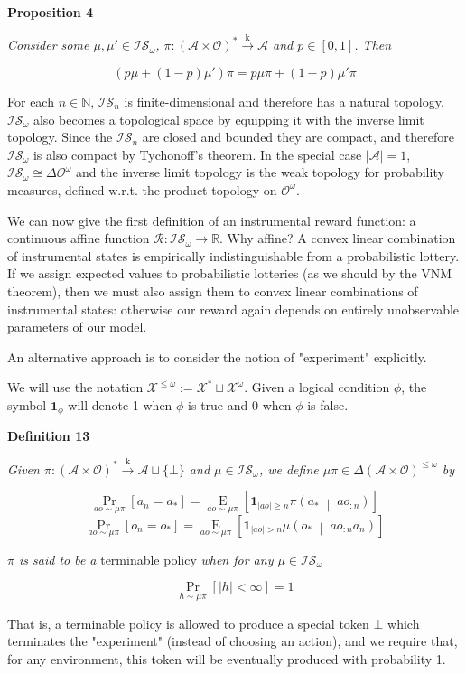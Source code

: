 \documentclass[a4paper]{article}
\newcommand{\Co}[1]{}
\newcommand{\AP}[1]{\left(#1\right)}
\newcommand{\AB}[1]{\left[#1\right]}
\newcommand{\APM}[2]{\left(#1\;\middle\vert\;#2\right)}
\newcommand{\Pa}[2]{\underset{#1}{\operatorname{Pr}}\AB{#2}}
\newcommand{\Ea}[2]{\underset{#1}{\operatorname{E}}\AB{#2}}
\newcommand{\Nats}{\mathbb{N}}
\newcommand{\Reals}{\mathbb{R}}
\newcommand{\Abs}[1]{\left\vert #1 \right\vert}
\newcommand{\K}{\xrightarrow{\mathrm{k}}}
\newcommand{\A}{\mathcal{A}}
\newcommand{\AX}{\A\sqcup\{\bot\}}
\newcommand{\Ob}{\mathcal{O}}
\newcommand{\AO}{\AP{\A\times\Ob}}
\newcommand{\FH}{\AO^*}
\newcommand{\R}{\mathcal{R}}
\newcommand{\IS}{\mathcal{IS}}
\newcommand{\X}{\mathcal{X}}
\begin{document}
\textbf{Proposition 4}\Co{b}

\textit{Consider some $\mu,\mu'\in\IS_\omega$,  $\pi:\FH\K\A$ and $p\in[0,1]$. Then}\Co{i}

$$\AP{p\mu+(1-p)\mu'}\pi=p\mu\pi+(1-p)\mu'\pi$$

For each $n\in\Nats$, $\IS_n$ is finite-dimensional and therefore has a natural topology. $\IS_\omega$ also becomes a topological space by equipping it with the inverse limit topology. Since the $\IS_n$ are closed and bounded they are compact, and therefore $\IS_\omega$ is also compact by Tychonoff's theorem. In the special case $\Abs{\A}=1$, $\IS_\omega\cong\Delta\Ob^\omega$ and the inverse limit topology is the weak topology for probability measures, defined w.r.t. the product topology on $\Ob^\omega$.

We can now give the first definition of an instrumental reward function: a continuous affine function $\R: \IS_\omega \rightarrow \Reals$. Why affine? A convex linear combination of instrumental states is empirically indistinguishable from a probabilistic lottery. If we assign expected values to probabilistic lotteries (as we should by the VNM theorem), then we must also assign them to convex linear combinations of instrumental states: otherwise our reward again depends on entirely unobservable parameters of our model.

An alternative approach is to consider the notion of "experiment" explicitly.

We will use the notation $\X^{\leq\omega}:=\X^*\sqcup\X^\omega$. Given a logical condition $\phi$, the symbol $\boldsymbol{1}_\phi$ will denote 1 when $\phi$ is true and 0 when $\phi$ is false.

\textbf{Definition 13}\Co{b}

\textit{Given $\pi: \FH\K\AX$ and $\mu\in\IS_\omega$, we define $\mu\pi\in\Delta\AO^{\leq\omega}$ by}\Co{i}

$$\Pa{ao\sim\mu\pi}{a_n=a_*}=\Ea{ao\sim\mu\pi}{\boldsymbol{1}_{\Abs{ao}\geq n}\pi\APM{a_*}{ao_{:n}}}$$
$$\Pa{ao\sim\mu\pi}{o_n=o_*}=\Ea{ao\sim\mu\pi}{\boldsymbol{1}_{\Abs{ao}> n}\mu\APM{o_*}{ao_{:n}a_n}}$$

\textit{$\pi$ is said to be a}\Co{i} terminable policy \textit{when for any $\mu\in\IS_\omega$}\Co{i}

$$\Pa{h\sim\mu\pi}{\Abs{h}<\infty} = 1$$

That is, a terminable policy is allowed to produce a special token $\bot$ which terminates the "experiment" (instead of choosing an action), and we require that, for any environment, this token will be eventually produced with probability 1.
\end{document}

